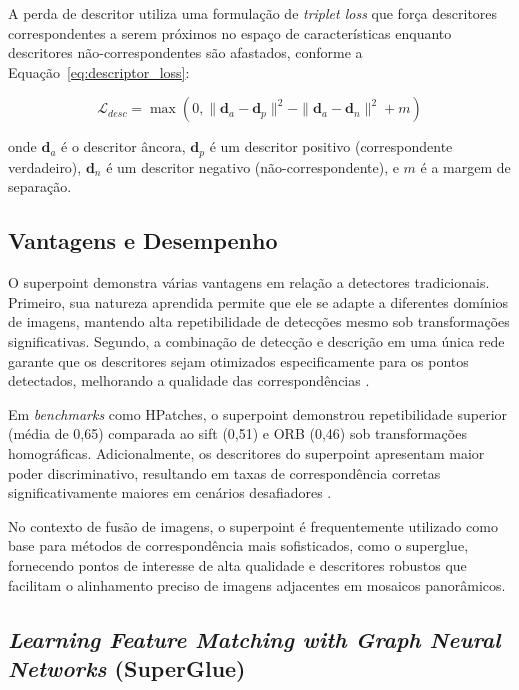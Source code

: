 A perda de descritor utiliza uma formulação de \textit{triplet loss} que força descritores correspondentes a serem próximos no espaço de características enquanto descritores não-correspondentes são afastados, conforme a Equação~\ref{eq:descriptor_loss}:

\begin{equation}
\label{eq:descriptor_loss}
\mathcal{L}_{desc} = \max(0, \|\mathbf{d}_a - \mathbf{d}_p\|^2 - \|\mathbf{d}_a - \mathbf{d}_n\|^2 + m)
\end{equation}

\noindent onde $\mathbf{d}_a$ é o descritor âncora, $\mathbf{d}_p$ é um descritor positivo (correspondente verdadeiro), $\mathbf{d}_n$ é um descritor negativo (não-correspondente), e $m$ é a margem de separação.

\subsection*{Vantagens e Desempenho}

O \gls{superpoint} demonstra várias vantagens em relação a detectores tradicionais. Primeiro, sua natureza aprendida permite que ele se adapte a diferentes domínios de imagens, mantendo alta repetibilidade de detecções mesmo sob transformações significativas. Segundo, a combinação de detecção e descrição em uma única rede garante que os descritores sejam otimizados especificamente para os pontos detectados, melhorando a qualidade das correspondências \cite{DeTone2018}.

Em \textit{benchmarks} como HPatches, o \gls{superpoint} demonstrou repetibilidade superior (média de 0,65) comparada ao \gls{sift} (0,51) e ORB (0,46) sob transformações homográficas. Adicionalmente, os descritores do \gls{superpoint} apresentam maior poder discriminativo, resultando em taxas de correspondência corretas significativamente maiores em cenários desafiadores \cite{DeTone2018}.

No contexto de fusão de imagens, o \gls{superpoint} é frequentemente utilizado como base para métodos de correspondência mais sofisticados, como o \gls{superglue}, fornecendo pontos de interesse de alta qualidade e descritores robustos que facilitam o alinhamento preciso de imagens adjacentes em mosaicos panorâmicos.

\subsection{\textit{Learning Feature Matching with Graph Neural Networks} (SuperGlue)}\label{subsec:superglue}

